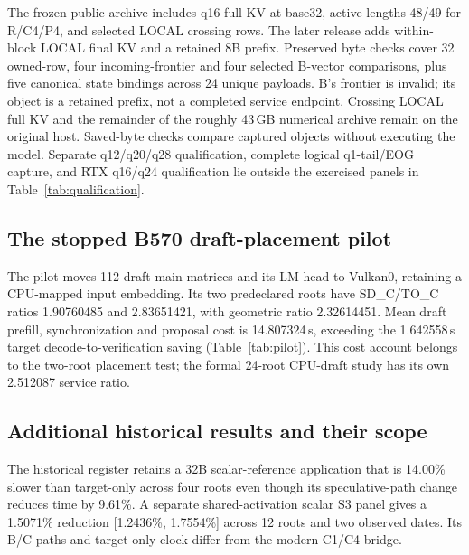 
The frozen public archive includes q16 full KV at base32, active lengths 48/49 for R/C4/P4, and selected LOCAL crossing rows. The later release adds within-block LOCAL final KV and a retained 8B prefix. Preserved byte checks cover 32 owned-row, four incoming-frontier and four selected B-vector comparisons, plus five canonical state bindings across 24 unique payloads. B's frontier is invalid; its object is a retained prefix, not a completed service endpoint. Crossing LOCAL full KV and the remainder of the roughly 43\,GB numerical archive remain on the original host. Saved-byte checks compare captured objects without executing the model. Separate q12/q20/q28 qualification, complete logical q1-tail/EOG capture, and RTX q16/q24 qualification lie outside the exercised panels in Table~\ref{tab:qualification}.

\FloatBarrier
\subsection{The stopped B570 draft-placement pilot}
\label{supp:pilot}
The pilot moves 112 draft main matrices and its LM head to Vulkan0, retaining a CPU-mapped input embedding. Its two predeclared roots have SD\_C/TO\_C ratios 1.90760485 and 2.83651421, with geometric ratio 2.32614451. Mean draft prefill, synchronization and proposal cost is 14.807324\,s, exceeding the 1.642558\,s target decode-to-verification saving (Table~\ref{tab:pilot}). This cost account belongs to the two-root placement test; the formal 24-root CPU-draft study has its own 2.512087 service ratio.


\FloatBarrier
\subsection{Additional historical results and their scope}
\label{supp:implementation}
The historical register retains a 32B scalar-reference application that is 14.00\% slower than target-only across four roots even though its speculative-path change reduces time by 9.61\%. A separate shared-activation scalar S3 panel gives a 1.5071\% reduction [1.2436\%, 1.7554\%] across 12 roots and two observed dates. Its B/C paths and target-only clock differ from the modern C1/C4 bridge.

